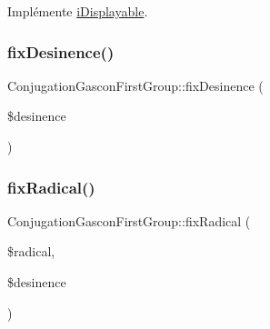 Implémente \hyperlink{interfacei_displayable_a0264fd455c876e897f754cf85f1681ca}{i\+Displayable}.

\hypertarget{class_conjugation_gascon_first_group_ad77d7a335be2cfd931aac7d90718c231}{}\label{class_conjugation_gascon_first_group_ad77d7a335be2cfd931aac7d90718c231} 
\subsubsection{\texorpdfstring{fix\+Desinence()}{fixDesinence()}}
{\footnotesize\ttfamily Conjugation\+Gascon\+First\+Group\+::fix\+Desinence (\begin{DoxyParamCaption}\item[{}]{\$desinence }\end{DoxyParamCaption})\hspace{0.3cm}{\ttfamily [protected]}}

\hypertarget{class_conjugation_gascon_first_group_ae03c569a6c3064a38d1eabeac9baf317}{}\label{class_conjugation_gascon_first_group_ae03c569a6c3064a38d1eabeac9baf317} 
\subsubsection{\texorpdfstring{fix\+Radical()}{fixRadical()}}
{\footnotesize\ttfamily Conjugation\+Gascon\+First\+Group\+::fix\+Radical (\begin{DoxyParamCaption}\item[{}]{\$radical,  }\item[{}]{\$desinence }\end{DoxyParamCaption})\hspace{0.3cm}{\ttfamily [protected]}}

\hypertarget{class_conjugation_gascon_first_group_a982308fd578abc51d30b667d5099d0c2}{}\label{class_conjugation_gascon_first_group_a982308fd578abc51d30b667d5099d0c2} 
